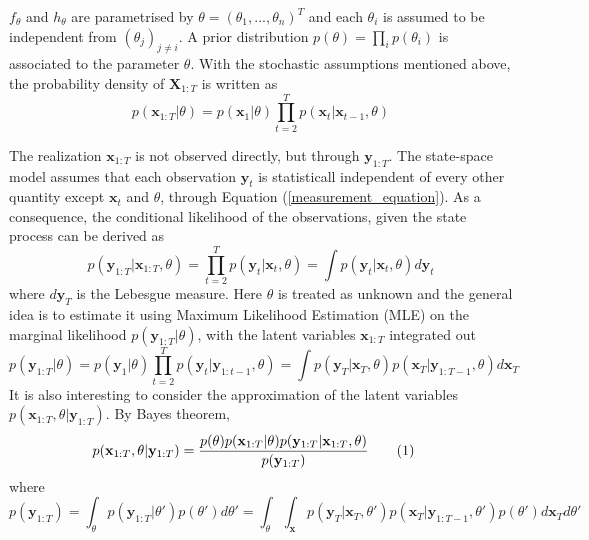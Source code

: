 \documentclass[11pt,a4,twosided,singlespacing,titlepagenumber=on]{scrreprt}
\numberwithin{equation}{chapter} %
\theoremstyle{remark}
\newcommand{\matr}[1]{\mathbf{#1}}
\newcommand\numberthis{\addtocounter{equation}{1}\tag{\theequation}}
\begin{document}
$f_\theta$ and $h_\theta$ are parametrised by $\theta = (\theta_1,...,\theta_n)^T$ and each $\theta_i$ is assumed to be independent from $(\theta_j)_{j \neq i}$. A prior distribution $p(\theta) = \prod_i p(\theta_i)$ is associated to the parameter $\theta$. With the stochastic assumptions mentioned above, the probability density of $\matr{X}_{1:T}$ is written as
\begin{equation}
p(\matr{x}_{1:T} | \theta) = p(\matr{x}_1|\theta) \prod_{t=2}^T p(\matr{x}_t|\matr{x}_{t-1}, \theta) 
\end{equation}

The realization $\matr{x}_{1:T}$ is not observed directly, but through $\matr{y}_{1:T}$. The state-space model assumes that each observation $\matr{y}_t$ is statisticall independent of every other quantity except $\matr{x}_t$ and $\theta$, through Equation (\ref{measurement_equation}). As a consequence, the conditional likelihood of the observations, given the state process can be derived as
\begin{equation}
p(\matr{y}_{1:T} | \matr{x}_{1:T}, \theta) = \prod_{t=2}^T p(\matr{y}_t | \matr{x}_t, \theta) = \int p(\matr{y}_t|\matr{x}_t, \theta) d\matr{y}_t
\end{equation}
where $d \matr{y}_T$ is the Lebesgue measure.
Here $\theta$ is treated as unknown and the general idea is to estimate it using Maximum Likelihood Estimation (MLE) on the marginal likelihood $p(\matr{y}_{1:T}|\theta)$, with the latent variables $\matr{x}_{1:T}$ integrated out
\begin{equation}
p(\matr{y}_{1:T} | \theta) = p(\matr{y}_1 |\theta) \prod_{t=2}^T p(\matr{y}_t | \matr{y}_{1:t-1}, \theta) = \int p(\matr{y}_T|\matr{x}_T, \theta) p(\matr{x}_T|\matr{y}_{1:T-1}, \theta) d \matr{x}_T\label{intractable_ssm_2}
\end{equation}
It is also interesting to consider the approximation of the latent variables $p(\matr{x}_{1:T}, \theta | \matr{y}_{1:T})$. By Bayes theorem,
\begin{align*}
p(\matr{x}_{1:T}, \theta | \matr{y}_{1:T}) &= \frac{ p(\theta)p(\matr{x}_{1:T}|\theta)p(\matr{y}_{1:T}|\matr{x}_{1:T}, \theta) }{p(\matr{y}_{1:T})}\numberthis \label{intractable_ssm}
\end{align*}
where
\begin{equation}
p(\matr{y}_{1:T}) = \int_\theta p(\matr{y}_{1:T}|\theta')p(\theta') d\theta' = \int_\theta \int_\matr{x} p(\matr{y}_T|\matr{x}_T, \theta') p(\matr{x}_T|\matr{y}_{1:T-1}, \theta') p(\theta') d \matr{x}_T d\theta'
\end{equation}
\end{document}
